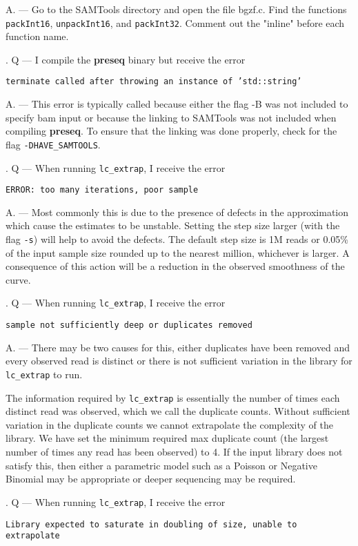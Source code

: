 \documentclass[11pt, titlepage]{article}
\newcounter{question}
\newcommand\Que[1]{%
   \leavevmode\par
   \stepcounter{question}
   \noindent
   \thequestion. Q --- #1\par}
\newcommand\Ans[1]{%
    \leavevmode\par\noindent
   {\leftskip37pt
    A. --- #1 \par }}
\newcommand{\fn}[1]{\texttt{#1}}
\begin{document}
\Ans{
Go to the SAMTools directory and open the file bgzf.c. Find the functions \fn{packInt16}, \fn{unpackInt16}, and \fn{packInt32}. Comment out the "inline" before each function name.
}



\Que{I compile the \textbf{preseq} binary but receive the error

\fn{terminate called after throwing an instance of 'std::string'}
}

\Ans{This error is typically called because either the flag -B was not included to
specify bam input or because the linking to SAMTools was not included when
compiling \textbf{preseq}.  To ensure that the linking was done properly, check for the flag
\fn{-DHAVE\_SAMTOOLS}.}

\Que{When running \fn{lc\_extrap}, I receive the error

\fn{ERROR:  too many iterations, poor sample}

}

\Ans{
Most commonly this is due to the presence of
defects in the approximation which cause the estimates to be unstable.  Setting the step
size larger (with the flag \fn{-s}) will help to avoid the defects.  The default step size is 1M reads or
0.05\% of the input sample size rounded up to the nearest million, whichever is larger.
A consequence of this action will be a reduction in the observed smoothness of the curve.
}


\Que{When running \fn{lc\_extrap}, I receive the error

\fn{sample not sufficiently deep or duplicates removed}
}

\Ans{There may be two causes for this, either duplicates have been removed and
every observed read is distinct or there is not sufficient variation in the library for
\fn{lc\_extrap} to run.

The information required by \fn{lc\_extrap} is essentially the number of times each
distinct read was observed, which we call the duplicate counts.
Without sufficient variation in the duplicate counts we cannot extrapolate the
complexity of the library.  We have set the minimum required max duplicate count
(the largest number of times any read has been observed) to 4.
If the input library does not satisfy this, then either a parametric model such
as a Poisson or Negative Binomial may be appropriate or deeper
sequencing may be required.}

\Que{When running \fn{lc\_extrap}, I receive the error

\fn{Library expected to saturate in doubling of size, unable to extrapolate}
}
\end{document}
